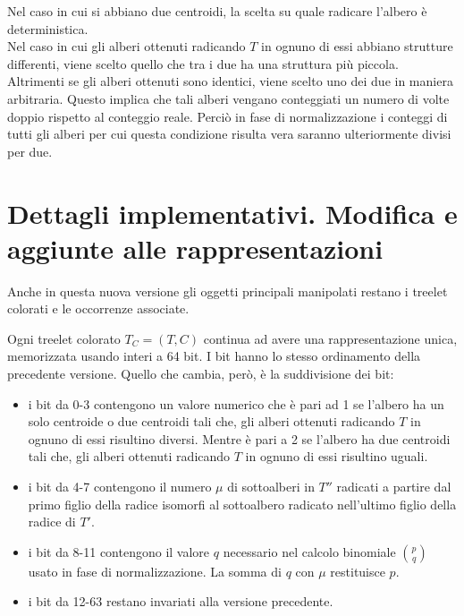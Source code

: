 Nel caso in cui si abbiano due centroidi, la scelta su quale radicare l'albero  \`e deterministica.\\
Nel caso in cui gli alberi ottenuti radicando $ T $ in ognuno di essi abbiano strutture differenti, viene scelto quello che tra i due ha una struttura pi\`u piccola.
Altrimenti se gli alberi ottenuti sono identici, viene scelto uno dei due in maniera arbitraria.
Questo implica che tali alberi vengano conteggiati un numero di volte doppio rispetto al conteggio reale.
Perci\`o in fase di normalizzazione i conteggi di tutti gli alberi per cui questa condizione risulta vera saranno ulteriormente divisi per due.


\section{Dettagli implementativi. Modifica e aggiunte alle rappresentazioni}
\label{cap 3:3}
Anche in questa nuova versione gli oggetti principali manipolati restano i treelet colorati e le occorrenze associate.

Ogni treelet colorato $ T_C = (T,C)$ continua ad avere una rappresentazione unica, memorizzata usando interi a 64 bit.
I bit hanno lo stesso ordinamento della precedente versione.
Quello che cambia, per\`o, \`e la suddivisione dei bit:
\begin{itemize}
	\item i bit da 0-3 contengono un valore numerico che \`e pari ad 1 se l'albero ha un solo centroide o due centroidi tali che, gli alberi ottenuti radicando $ T $ in ognuno di essi risultino diversi.
	Mentre \`e pari a  2 se l'albero ha due centroidi tali che, gli alberi ottenuti radicando $ T $ in ognuno di essi risultino uguali.
	\item  i bit da 4-7 contengono il numero $\mu$ di sottoalberi in $ T'' $ radicati a partire dal primo figlio della radice isomorfi al sottoalbero radicato nell'ultimo figlio della radice di $ T' $.
	\item i bit da 8-11 contengono il valore $ q $ necessario nel calcolo binomiale $ \binom{p}{q} $ usato in fase di normalizzazione.
	La somma di $ q $ con $\mu$ restituisce $ p $.
	\item i bit da 12-63 restano invariati alla versione precedente.	  
\end{itemize} 

